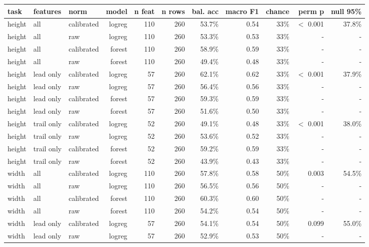 \begin{adjustbox}{max width=\textwidth}
{\scriptsize
\begin{tabular}{lllrrrrrrrr}
\toprule
\textbf{task} & \textbf{features} & \textbf{norm} & \textbf{model} & \textbf{n feat} & \textbf{n rows} & \textbf{bal. acc} & \textbf{macro F1} & \textbf{chance} & \textbf{perm p} & \textbf{null 95\%} \\
\midrule
height & all & calibrated & logreg & 110 & 260 & 53.7\% & 0.54 & 33\% & $<$ 0.001 & 37.8\% \\
height & all & raw & logreg & 110 & 260 & 53.3\% & 0.53 & 33\% & - & - \\
height & all & calibrated & forest & 110 & 260 & 58.9\% & 0.59 & 33\% & - & - \\
height & all & raw & forest & 110 & 260 & 49.4\% & 0.48 & 33\% & - & - \\
height & lead only & calibrated & logreg & 57 & 260 & 62.1\% & 0.62 & 33\% & $<$ 0.001 & 37.9\% \\
height & lead only & raw & logreg & 57 & 260 & 56.4\% & 0.56 & 33\% & - & - \\
height & lead only & calibrated & forest & 57 & 260 & 59.3\% & 0.59 & 33\% & - & - \\
height & lead only & raw & forest & 57 & 260 & 51.6\% & 0.50 & 33\% & - & - \\
height & trail only & calibrated & logreg & 52 & 260 & 49.1\% & 0.48 & 33\% & $<$ 0.001 & 38.0\% \\
height & trail only & raw & logreg & 52 & 260 & 53.6\% & 0.52 & 33\% & - & - \\
height & trail only & calibrated & forest & 52 & 260 & 59.2\% & 0.59 & 33\% & - & - \\
height & trail only & raw & forest & 52 & 260 & 43.9\% & 0.43 & 33\% & - & - \\
width & all & calibrated & logreg & 110 & 260 & 57.8\% & 0.58 & 50\% & 0.003 & 54.5\% \\
width & all & raw & logreg & 110 & 260 & 56.5\% & 0.56 & 50\% & - & - \\
width & all & calibrated & forest & 110 & 260 & 60.3\% & 0.60 & 50\% & - & - \\
width & all & raw & forest & 110 & 260 & 54.2\% & 0.54 & 50\% & - & - \\
width & lead only & calibrated & logreg & 57 & 260 & 54.1\% & 0.54 & 50\% & 0.099 & 55.0\% \\
width & lead only & raw & logreg & 57 & 260 & 52.9\% & 0.53 & 50\% & - & - \\

\end{tabular}}
\end{adjustbox}
